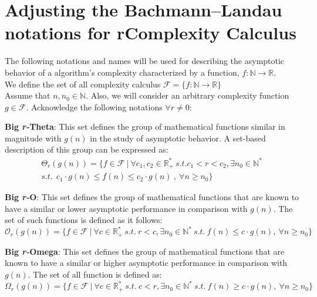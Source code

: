 \section{Adjusting the Bachmann–Landau notations for rComplexity Calculus}
The following notations and names will be used for describing the asymptotic behavior of a algorithm's complexity characterized by a function, $f:\mathbb{N}\longrightarrow\mathbb{R}$. \\
We define the set of all complexity calculus $\mathcal{F}= \lbrace f:\mathbb{N}\longrightarrow\mathbb{R} \rbrace$
\\Assume that $n, n_{0}\in\mathbb{N}$. Also, we will consider an arbitrary complexity function $g \in \mathcal{F}$. 
Acknowledge the following notations $\forall r \neq 0$:

\begin{definition} \textbf{Big \textit{r-}Theta}: This set defines the group of mathematical functions similar in magnitude with  $g(n)$ in the study of asymptotic behavior. A set-based description of this group can be expressed as:
  \[\begin{split} \Theta_{r}(g(n)) = \lbrace f \in \mathcal{F}\ |\ \forall c_{1}, c_{2} \in \mathbb{R}^{*}_{+} \ s.t.  c_{1}< r < c_{2} , \exists n_{0} \in \mathbb{N}^{*}\ \\ s.t.\ \ c_{1} \cdot g(n) \leq f(n) \leq c_{2} \cdot g(n)\ ,\  \forall n \geq n_{0} \rbrace \end{split} \]
\end{definition} 

\begin{definition} \textbf{Big \textit{r-}O}: This set defines the group of mathematical functions that are known to have a similar or lower
 asymptotic performance in comparison with  $g(n)$. The set of such functions is defined as it follows:
  \[\mathcal{O}_{r}(g(n)) = \lbrace f \in \mathcal{F}\ |\ \forall c  \in \mathbb{R}^{*}_{+} \ s.t.\  r<c, \exists n_{0} \in \mathbb{N}^{*}\ s.t.\  f(n) \leq c \cdot g(n),\  \forall n \geq n_{0} \rbrace\]
\end{definition}

\begin{definition} \textbf{Big \textit{r-}Omega}: This set defines the group of mathematical functions that are known to have a similar or higher asymptotic performance in comparison with  $g(n)$. The set of all function is defined as:
    \[\Omega_{r}(g(n)) = \lbrace f \in \mathcal{F}\ |\ \forall c  \in \mathbb{R}^{*}_{+}\ s.t. \ c < r, \exists n_{0} \in \mathbb{N}^{*}\ s.t.\  f(n) \geq c \cdot g(n),\  \forall n \geq n_{0} \rbrace\]
\end{definition}

